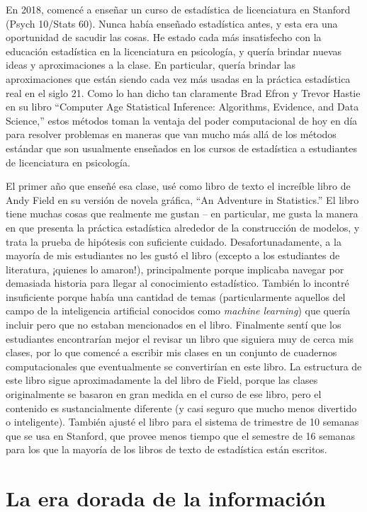 \documentclass[
  12pt,
]{book}
\begin{document}
En 2018, comencé a enseñar un curso de estadística de licenciatura en Stanford (Psych 10/Stats 60). Nunca había enseñado estadística antes, y esta era una oportunidad de sacudir las cosas. He estado cada más insatisfecho con la educación estadística en la licenciatura en psicología, y quería brindar nuevas ideas y aproximaciones a la clase. En particular, quería brindar las aproximaciones que están siendo cada vez más usadas en la práctica estadística real en el siglo 21. Como lo han dicho tan claramente Brad Efron y Trevor Hastie en su libro ``Computer Age Statistical Inference: Algorithms, Evidence, and Data Science,'' estos métodos toman la ventaja del poder computacional de hoy en día para resolver problemas en maneras que van mucho más allá de los métodos estándar que son usualmente enseñados en los cursos de estadística a estudiantes de licenciatura en psicología.

El primer año que enseñé esa clase, usé como libro de texto el increíble libro de Andy Field en su versión de novela gráfica, ``An Adventure in Statistics.'' El libro tiene muchas cosas que realmente me gustan -- en particular, me gusta la manera en que presenta la práctica estadística alrededor de la construcción de modelos, y trata la prueba de hipótesis con suficiente cuidado. Desafortunadamente, a la mayoría de mis estudiantes no les gustó el libro (excepto a los estudiantes de literatura, ¡quienes lo amaron!), principalmente porque implicaba navegar por demasiada historia para llegar al conocimiento estadístico. También lo incontré insuficiente porque había una cantidad de temas (particularmente aquellos del campo de la inteligencia artificial conocidos como \emph{machine learning}) que quería incluir pero que no estaban mencionados en el libro. Finalmente sentí que los estudiantes encontrarían mejor el revisar un libro que siguiera muy de cerca mis clases, por lo que comencé a escribir mis clases en un conjunto de cuadernos computacionales que eventualmente se convertirían en este libro. La estructura de este libro sigue aproximadamente la del libro de Field, porque las clases originalmente se basaron en gran medida en el curso de ese libro, pero el contenido es sustancialmente diferente (y casi seguro que mucho menos divertido o inteligente). También ajusté el libro para el sistema de trimestre de 10 semanas que se usa en Stanford, que provee menos tiempo que el semestre de 16 semanas para los que la mayoría de los libros de texto de estadística están escritos.

\hypertarget{la-era-dorada-de-la-informaciuxf3n}{%
\section{La era dorada de la información}\label{la-era-dorada-de-la-informaciuxf3n}}
\end{document}
